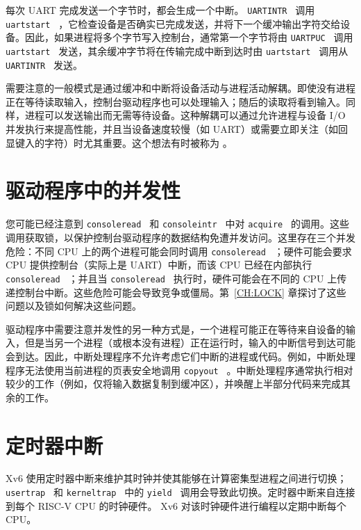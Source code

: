 每次 UART 完成发送一个字节时，都会生成一个中断。
  {    \tt    UARTINTR   }  调用  {    \tt    uartstart   }  ，它检查设备是否确实已完成发送，并将下一个缓冲输出字符交给设备。因此，如果进程将多个字节写入控制台，通常第一个字节将由  {    \tt    UARTPUC   }  调用  {    \tt    uartstart   }  发送，其余缓冲字节将在传输完成中断到达时由  {    \tt    uartstart   }  调用从  {    \tt    UARTINTR   }  发送。  

需要注意的一般模式是通过缓冲和中断将设备活动与进程活动解耦。即使没有进程正在等待读取输入，控制台驱动程序也可以处理输入；随后的读取将看到输入。同样，进程可以发送输出而无需等待设备。这种解耦可以通过允许进程与设备 I/O 并发执行来提高性能，并且当设备速度较慢（如 UART）或需要立即关注（如回显键入的字符）时尤其重要。这个想法有时被称为        。  

   \section{驱动程序中的并发性  }     

您可能已经注意到  {    \tt    consoleread   }  和  {    \tt    consoleintr   }  中对  {    \tt    acquire   }  的调用。这些调用获取锁，以保护控制台驱动程序的数据结构免遭并发访问。这里存在三个并发危险：不同 CPU 上的两个进程可能会同时调用  {    \tt    consoleread   } ；硬件可能会要求 CPU 提供控制台（实际上是 UART）中断，而该 CPU 已经在内部执行
  {    \tt    consoleread   }  ；并且当  {    \tt    consoleread   }  执行时，硬件可能会在不同的 CPU 上传递控制台中断。这些危险可能会导致竞争或僵局。第~\ref{CH:LOCK}    章探讨了这些问题以及锁如何解决这些问题。  

驱动程序中需要注意并发性的另一种方式是，一个进程可能正在等待来自设备的输入，但是当另一个进程（或根本没有进程）正在运行时，输入的中断信号到达可能会到达。因此，中断处理程序不允许考虑它们中断的进程或代码。例如，中断处理程序无法使用当前进程的页表安全地调用  {    \tt    copyout   } 。中断处理程序通常执行相对较少的工作（例如，仅将输入数据复制到缓冲区），并唤醒上半部分代码来完成其余的工作。  

   \section{定时器中断  }     

Xv6 使用定时器中断来维护其时钟并使其能够在计算密集型进程之间进行切换；  {    \tt    usertrap   }  和  {    \tt    kerneltrap   }  中的  {    \tt    yield   }  调用会导致此切换。定时器中断来自连接到每个 RISC-V CPU 的时钟硬件。 Xv6 对该时钟硬件进行编程以定期中断每个 CPU。  

